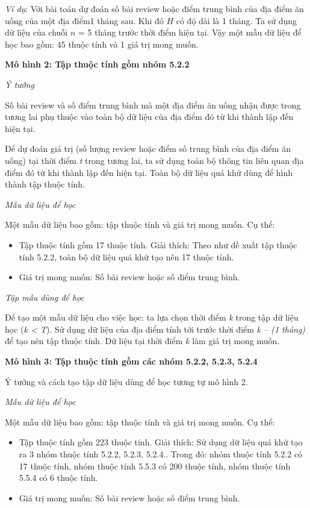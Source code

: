 \documentclass[12pt]{extarticle}
\begin{document}
			\par \textit{Ví dụ}: Với bài toán dự đoán số bài review hoặc điểm trung bình của địa điểm ăn uống của một địa điểm1 tháng sau. Khi đó $H$ có độ dài là 1 tháng. Ta sử dụng dữ liệu của chuỗi $n$ = 5 tháng trước thời điểm hiện tại. Vậy một mẫu dữ liệu để học bao gồm: 45 thuộc tính và 1 giá trị mong muốn.
			\par \textbf{Mô hình 2: Tập thuộc tính gồm nhóm 5.2.2}
			\par \textit{Ý tưởng}
			\par Số bài review và số điểm trung bình mà một địa điểm ăn uống nhận được trong tương lai phụ thuộc vào toàn bộ dữ liệu của địa điểm đó từ khi thành lập đến hiện tại.
			\par Để dự đoán giá trị (số lượng review hoặc điểm số trung bình của địa điểm ăn uống) tại thời điểm \textit{t} trong tương lai, ta sử dụng toàn bộ thông tin liên quan địa điểm đó từ khi thành lập đến hiện tại. Toàn bộ dữ liệu quá khứ dùng để hình thành tập thuộc tính.
			\par \textit{Mẫu dữ liệu để học}
				\par Một mẫu dữ liệu bao gồm: tập thuộc tính và giá trị mong muốn. Cụ thể:
				\begin{itemize}
					\item Tập thuộc tính gồm 17 thuộc tính. Giải thích: Theo như đề xuất tập thuộc tính 5.2.2, toàn bộ dữ liệu quá khứ tạo nên 17 thuộc tính.  
					\item Giá trị mong muốn: Số bài review hoặc số điểm trung bình.
				\end{itemize}
			\par \textit{Tập mẫu dùng để học}
			\par  Để tạo một mẫu dữ liệu cho việc học:  ta lựa chọn thời điểm \textit{k} trong tập dữ liệu học (\textit{k < T}). Sử dụng dữ liệu của địa điểm tính tới trước thời điểm \textit{k – (1 tháng)} để tạo nên tập thuộc tính. Dữ liệu tại thời điểm \textit{k} làm giá trị mong muốn. 
			\par \textbf{Mô hình 3: Tập thuộc tính gồm các nhóm 5.2.2, 5.2.3, 5.2.4}
			\par Ý tưởng và cách tạo tập dữ liệu dùng để học tương tự mô hình 2.
			\par \textit{Mẫu dữ liệu để học}
			\par Một mẫu dữ liệu bao gồm: tập thuộc tính và giá trị mong muốn. Cụ thể:
				\begin{itemize}
					\item Tập thuộc tính gồm 223 thuộc tính. Giải thích: Sử dụng dữ liệu quá khứ tạo ra 3 nhóm thuộc tính 5.2.2, 5.2.3, 5.2.4.. Trong đó: nhóm thuộc tính 5.2.2 có 17 thuộc tính, nhóm thuộc tính 5.5.3 có 200 thuộc tính, nhóm thuộc tính 5.5.4 có 6 thuộc tính. 
					\item Giá trị mong muốn: Số bài review hoặc số điểm trung bình.
				\end{itemize}
\end{document}
